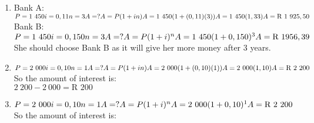 \begin{eocsolutions}{}
{\begin{enumerate}[itemsep=5pt, label=\textbf{\arabic*}. ]
\begin{multicols}{2}
\begin{enumerate}[noitemsep, label=\textbf{(\alph*)} ]
 \item  $P = 500\\
i=0,04\\
n=1\\
A=?\\
A=P(1 + i)^{n}\\
A = 500(1 + 0,04)^{1}\\
A = \mbox{R }520$
	\end{enumerate}
\end{multicols}
\item Bank A:\\
$P=1~450\\
i=0,11\\
n=3\\
A=?\\
 A=P(1 + in) \\
A = 1~450(1+ (0,11)(3))\\
A = 1~450(1,33)\\
A = \mbox{R }1~925,50$\\
Bank B:\\
 $P = 1~450\\
i=0,150\\
n=3\\
A=?\\
A=P(1 + i)^{n}\\
A = 1~450(1 + 0,150)^{3}\\
A = \mbox{R }1956,39$\\
She should choose Bank B as it will give her more money after 3 years.
\item $P=2~000\\
i=0,10\\
n=1\\
A=?\\
 A=P(1 + in) \\
A = 2~000(1+ (0,10)(1))\\
A = 2~000(1,10)\\
A = \mbox{R }2~200$\\
So the amount of interest is:\\
$2~200 - 2~000 = \mbox{R }200$
\item  $P = 2~000\\
i=0,10\\
n=1\\
A=?\\
A=P(1 + i)^{n}\\
A = 2~000(1 + 0,10)^{1}\\
A = \mbox{R }2~200$\\
So the amount of interest is:\\

\end{enumerate}}
\end{eocsolutions}
